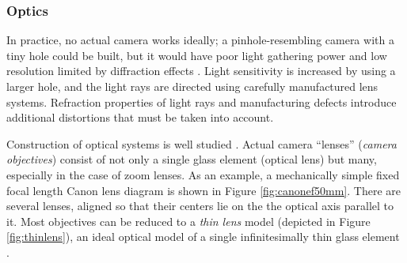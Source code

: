 
\subsubsection{Optics} %

In practice, no actual camera works ideally; a pinhole-resembling camera with a tiny hole could be built, but it would have poor light gathering power and low resolution limited by diffraction effects \cite{greenleaf1950photographic}.
Light sensitivity is increased by using a larger hole, and the light rays are directed using carefully manufactured lens systems.
Refraction properties of light rays and manufacturing defects introduce additional distortions that must be taken into account.

Construction of optical systems is well studied \cite{kingslake1989history,greenleaf1950photographic}.
Actual camera ``lenses'' (\emph{camera objectives}) consist of not only a single glass element (optical lens) but many, especially in the case of zoom lenses.
As an example, a mechanically simple fixed focal length Canon lens diagram is shown in Figure \ref{fig:canonef50mm}.
There are several lenses, aligned so that their centers lie on the the optical axis parallel to it.
Most objectives can be reduced to a \emph{thin lens} model (depicted in Figure \ref{fig:thinlens}), an ideal optical model of a single infinitesimally thin glass element \cite{greenleaf1950photographic,szeliski10vision}.




